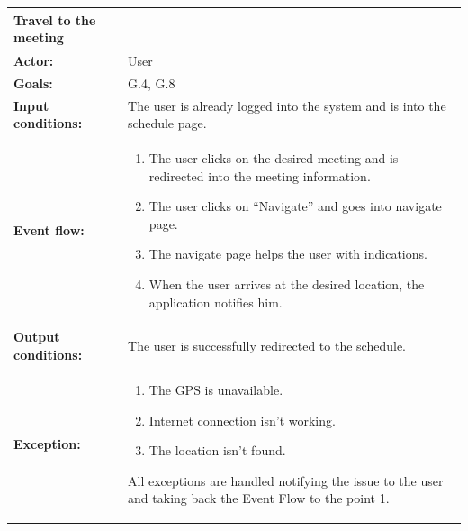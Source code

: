 \begin{tabular} { p{5cm} p{8cm} }  
\textbf{Travel to the meeting}\\
\hline
\textbf{Actor:} & User \\ 
\textbf{Goals:} & G.4, G.8 \\ 
\textbf{Input conditions:} & The user is already logged into the system and is into the schedule page. \\
\textbf{Event flow:} & \begin{enumerate}
				\item
				The user clicks on the desired meeting and is redirected into the meeting information.
				\item
				The user clicks on “Navigate” and goes into navigate page.
				\item
				The navigate page helps the user with indications.
				\item
				When the user arrives at the desired location, the application notifies him.
			\end{enumerate} \\ 
\textbf{Output conditions:} & The user is successfully redirected to the
schedule.\\ 
\textbf{Exception:} & \begin{enumerate}
				\item
				The GPS is unavailable.
				\item
				Internet connection isn't working.				
				\item
				The location isn’t found. 
			\end{enumerate}
All exceptions are handled notifying the issue to the user and taking back the Event Flow to the point 1. \\
\hline
\end{tabular}


